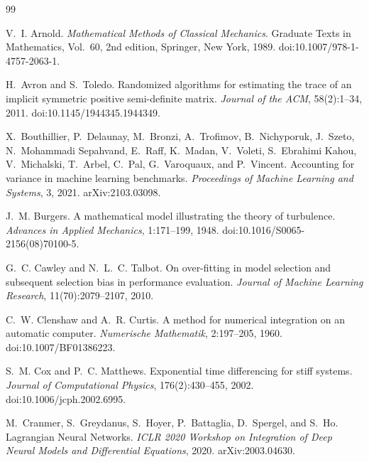 \documentclass[11pt]{article}
\theoremstyle{definition}
\theoremstyle{remark}
\begin{document}
\begin{thebibliography}{99}\small

V.~I. Arnold.
\newblock \emph{Mathematical Methods of Classical Mechanics}.
\newblock Graduate Texts in Mathematics, Vol.~60, 2nd edition, Springer, New
York, 1989. doi:10.1007/978-1-4757-2063-1.

H.~Avron and S.~Toledo.
\newblock Randomized algorithms for estimating the trace of an implicit
symmetric positive semi-definite matrix.
\newblock \emph{Journal of the ACM}, 58(2):1--34, 2011.
doi:10.1145/1944345.1944349.

X.~Bouthillier, P.~Delaunay, M.~Bronzi, A.~Trofimov, B.~Nichyporuk, J.~Szeto,
N.~Mohammadi Sepahvand, E.~Raff, K.~Madan, V.~Voleti, S.~Ebrahimi Kahou,
V.~Michalski, T.~Arbel, C.~Pal, G.~Varoquaux, and P.~Vincent.
\newblock Accounting for variance in machine learning benchmarks.
\newblock \emph{Proceedings of Machine Learning and Systems}, 3, 2021.
arXiv:2103.03098.

J.~M. Burgers.
\newblock A mathematical model illustrating the theory of turbulence.
\newblock \emph{Advances in Applied Mechanics}, 1:171--199, 1948.
doi:10.1016/S0065-2156(08)70100-5.

G.~C. Cawley and N.~L.~C. Talbot.
\newblock On over-fitting in model selection and subsequent selection bias in
performance evaluation.
\newblock \emph{Journal of Machine Learning Research}, 11(70):2079--2107, 2010.

C.~W. Clenshaw and A.~R. Curtis.
\newblock A method for numerical integration on an automatic computer.
\newblock \emph{Numerische Mathematik}, 2:197--205, 1960.
doi:10.1007/BF01386223.

S.~M. Cox and P.~C. Matthews.
\newblock Exponential time differencing for stiff systems.
\newblock \emph{Journal of Computational Physics}, 176(2):430--455, 2002.
doi:10.1006/jcph.2002.6995.

M.~Cranmer, S.~Greydanus, S.~Hoyer, P.~Battaglia, D.~Spergel, and S.~Ho.
\newblock Lagrangian Neural Networks.
\newblock \emph{ICLR 2020 Workshop on Integration of Deep Neural Models and
Differential Equations}, 2020. arXiv:2003.04630.


\end{thebibliography}
\end{document}
